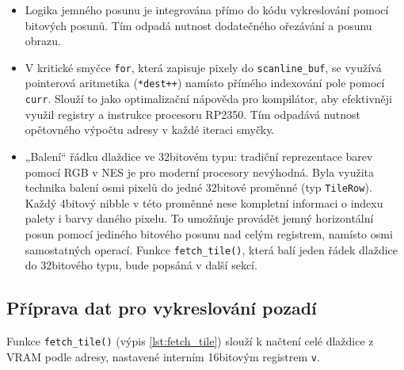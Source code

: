 \begin{itemize}
    \item Logika jemného posunu je integrována přímo do kódu vykreslování pomocí bitových posunů.
        Tím odpadá nutnost dodatečného ořezávání a posunu obrazu.
    \item V kritické smyčce \texttt{for}, která zapisuje pixely do \texttt{scanline\_buf}, se využívá
        pointerová aritmetika (\texttt{*dest++}) namísto přímého indexování pole pomocí \texttt{curr}.
        Slouží to jako optimalizační nápověda pro kompilátor, aby efektivněji využil registry a
        instrukce procesoru RP2350. Tím odpadává nutnost opětovného výpočtu adresy v každé iteraci
        smyčky.
    \item „Balení“ řádku dlaždice ve 32bitovém typu: tradiční reprezentace barev pomocí RGB v NES je
        pro moderní procesory nevýhodná. Byla využita technika balení osmi pixelů do jedné 32bitové
        proměnné (typ \texttt{TileRow}). Každý 4bitový nibble v této proměnné nese kompletní
        informaci o indexu palety i barvy daného pixelu. To umožňuje provádět jemný horizontální
        posun pomocí jediného bitového posunu nad celým registrem, namísto osmi samostatných
        operací. Funkce \texttt{fetch\_tile()}, která balí jeden řádek dlaždice do 32bitového typu,
        bude popsáná v další sekcí.
\end{itemize}

\subsection{Příprava dat pro vykreslování pozadí}

Funkce \texttt{fetch\_tile()} (výpis \ref{lst:fetch_tile}) slouží k načtení celé dlaždice z VRAM
podle adresy, nastavené interním 16bitovým registrem \texttt{v}.

